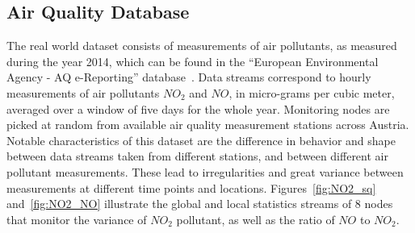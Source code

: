 \subsection{Air Quality Database}

The real world dataset consists of measurements of air pollutants, as measured during the year 2014, which can be found in the ``European Environmental Agency - AQ e-Reporting'' database~\cite{AirBase}. Data streams correspond to hourly measurements of air pollutants $NO_2$ and $NO$, in micro-grams per cubic meter, averaged over a window of five days for the whole year. Monitoring nodes are picked at random from available air quality measurement stations across Austria. Notable characteristics of this dataset are the difference in behavior and shape between data streams taken from different stations, and between different air pollutant measurements. These lead to irregularities and great variance between measurements at different time points and locations. Figures~\ref{fig:NO2_sq} and~\ref{fig:NO2_NO} illustrate the global and local statistics streams of 8 nodes that monitor the variance of $NO_2$ pollutant, as well as the ratio of $NO$ to $NO_2$.

